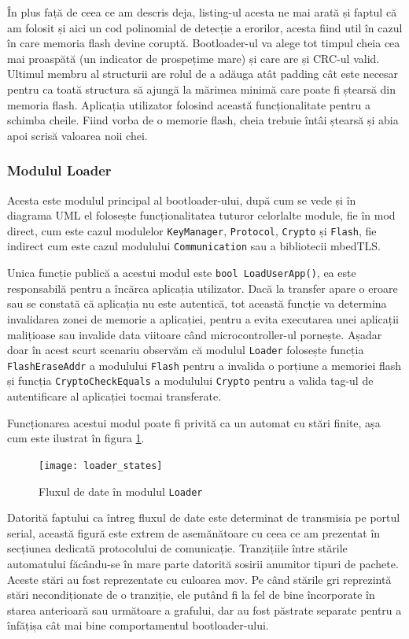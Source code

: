 \documentclass[12pt,a4paper,titlepage]{report}
\begin{document}
În plus față de ceea ce am descris deja, listing-ul acesta ne mai arată și faptul că am folosit și aici un cod polinomial de detecție a erorilor, acesta fiind util în cazul în care memoria flash devine coruptă. Bootloader-ul va alege tot timpul cheia cea mai proaspătă (un indicator de prospețime mare) și care are și CRC-ul valid. Ultimul membru al structurii are rolul de a adăuga atât padding cât este necesar pentru ca toată structura să ajungă la mărimea minimă care poate fi ștearsă din memoria flash. Aplicația utilizator folosind această funcționalitate pentru a schimba cheile. Fiind vorba de o memorie flash, cheia trebuie întâi ștearsă și abia apoi scrisă valoarea noii chei.

\subsubsection{Modulul Loader}

Acesta este modulul principal al bootloader-ului, după cum se vede și în diagrama UML el folosește funcționalitatea tuturor celorlalte module, fie în mod direct, cum este cazul modulelor \texttt{KeyManager}, \texttt{Protocol}, \texttt{Crypto} și \texttt{Flash}, fie indirect cum este cazul modulului \texttt{Communication} sau a bibliotecii mbedTLS.

Unica funcție publică a acestui modul este \texttt{bool LoadUserApp()}, ea este responsabilă pentru a încărca aplicația utilizator. Dacă la transfer apare o eroare sau se constată că aplicația nu este autentică, tot această funcție va determina invalidarea zonei de memorie a aplicației, pentru a evita executarea unei aplicații malițioase sau invalide data viitoare când microcontroller-ul pornește. Așadar doar în acest scurt scenariu observăm că modulul \texttt{Loader} folosește funcția \texttt{FlashEraseAddr} a modulului \texttt{Flash} pentru a invalida o porțiune a memoriei flash și funcția \texttt{CryptoCheckEquals} a modulului \texttt{Crypto} pentru a valida tag-ul de autentificare al aplicației tocmai transferate.

Funcționarea acestui modul poate fi privită ca un automat cu stări finite, așa cum este ilustrat în figura \ref{loaderStates}.

\begin{figure}[h]
    \centering
    \texttt{[image: loader\_states]}
    \caption{Fluxul de date în modulul \texttt{Loader}}
    \label{loaderStates}
\end{figure}

Datorită faptului ca întreg fluxul de date este determinat de transmisia pe portul serial, această figură este extrem de asemănătoare cu ceea ce am prezentat în secțiunea dedicată protocolului de comunicație. Tranzițiile între stările automatului făcându-se în mare parte datorită sosirii anumitor tipuri de pachete. Aceste stări au fost reprezentate cu culoarea mov. Pe când stările gri reprezintă stări necondiționate de o tranziție, ele putând fi la fel de bine încorporate în starea anterioară sau următoare a grafului, dar au fost păstrate separate pentru a înfățișa cât mai bine comportamentul bootloader-ului.
\end{document}
